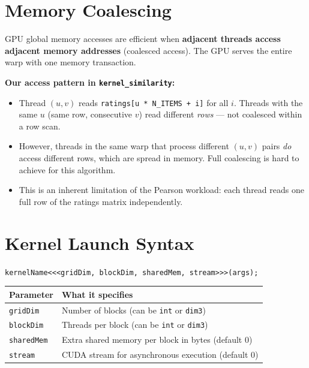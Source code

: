 \documentclass[12pt,a4paper]{article}
\begin{document}
\section{Memory Coalescing}

GPU global memory accesses are efficient when \textbf{adjacent threads access
adjacent memory addresses} (coalesced access).  The GPU serves the entire
warp with one memory transaction.

\textbf{Our access pattern in \texttt{kernel\_similarity}:}
\begin{itemize}
    \item Thread $(u, v)$ reads \texttt{ratings[u * N\_ITEMS + i]} for all $i$.
          Threads with the same $u$ (same row, consecutive $v$) read different
          \emph{rows} — not coalesced within a row scan.
    \item However, threads in the same warp that process different $(u,v)$
          pairs \emph{do} access different rows, which are spread in memory.
          Full coalescing is hard to achieve for this algorithm.
    \item This is an inherent limitation of the Pearson workload: each thread
          reads one full row of the ratings matrix independently.
\end{itemize}

\section{Kernel Launch Syntax}

\begin{center}
\texttt{kernelName\textless\textless\textless gridDim, blockDim, sharedMem, stream\textgreater\textgreater\textgreater(args);}
\end{center}

\begin{center}
\begin{tabular}{ll}
\toprule
Parameter & What it specifies \\
\midrule
\texttt{gridDim} & Number of blocks (can be \texttt{int} or \texttt{dim3}) \\
\texttt{blockDim} & Threads per block (can be \texttt{int} or \texttt{dim3}) \\
\texttt{sharedMem} & Extra shared memory per block in bytes (default 0) \\
\texttt{stream} & CUDA stream for asynchronous execution (default 0) \\
\bottomrule
\end{tabular}
\end{center}
\end{document}
